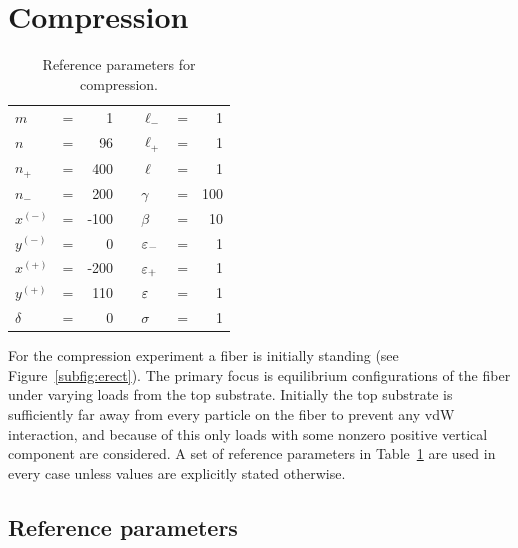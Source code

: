 \section{Compression}

	\begin{table}[th]
		\centering
		\caption{Reference parameters for compression.\label{table:compression_reference}}
		\begin{tabular}{lcrclcr}
			$m$ & = & 1 & \hspace{1in} & $\ell_-$ & = & 1 \\
			$n$ & = & 96 & & $\ell_+$ & = & 1 \\
			$n_+$ & = & 400 & & $\ell$ & = & 1 \\
			$n_-$ & = & 200 & & $\gamma$ & = & 100 \\
			$x^{(-)}$ & = & -100 & & $\beta$ & = & 10 \\
			$y^{(-)}$ & = & 0 & & $\varepsilon_-$ & = & 1 \\
			$x^{(+)}$ & = & -200 & & $\varepsilon_+$ & = & 1 \\
			$y^{(+)}$ & = & 110 & & $\varepsilon$ & = & 1 \\
			$\delta$ & = & 0 & & $\sigma$ & = & 1
		\end{tabular}
	\end{table}
For the compression experiment a fiber is initially standing (see Figure~\ref{subfig:erect}). The primary focus is equilibrium configurations of the fiber under varying loads from the top substrate. Initially the top substrate is sufficiently far away from every particle on the fiber to prevent any vdW interaction, and because of this only loads with some nonzero positive vertical component are considered. A set of reference parameters in Table~\ref{table:compression_reference} are used in every case unless values are explicitly stated otherwise.

\subsection{Reference parameters}

